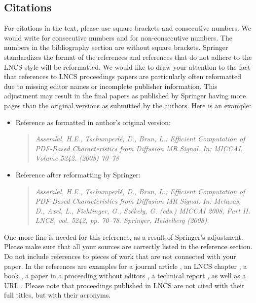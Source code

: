 \documentclass[runningheads]{llncs}
\begin{document}
	\subsection{Citations}
	For citations in the text, please use square brackets and consecutive numbers.
	We would write \cite{Alpher02,Alpher03,Alpher04,Authors10,Authors10b} for consecutive numbers and \cite{Alpher02,Alpher04,Authors10b} for non-consecutive numbers.
	The numbers in the bibliography section are without square brackets.
	Springer standardizes the format of the references and references that do not adhere to the LNCS style will be reformatted.
	We would like to draw your attention to the fact that references to LNCS proceedings papers are particularly often reformatted due to missing editor names or incomplete publisher information.
	This adjustment may result in the final papers as published by Springer having more pages than the original versions as submitted by the authors.
	Here is an example:
	\begin{itemize}
		\item Reference as formatted in author's original version:
		\begin{quote}
			\emph{Assemlal, H.E., Tschumperl\'{e}, D., Brun, L.: Efficient Computation of PDF-Based Characteristics from Diffusion MR Signal. In: MICCAI. Volume 5242. (2008) 70–78}
		\end{quote}
		\item Reference after reformatting by Springer:
		\begin{quote}
			\emph{Assemlal, H.E., Tschumperl\'{e}, D., Brun, L.: Efficient Computation of PDF-Based Characteristics from Diffusion MR Signal. In: Metaxas, D., Axel, L., Fichtinger, G., Sz\'{e}kely, G. (eds.) MICCAI 2008, Part II. LNCS, vol. 5242, pp. 70–78. Springer, Heidelberg (2008)}
		\end{quote}
	\end{itemize}
	One more line is needed for this reference, as a result of Springer’s adjustment.
	Please make sure that all your sources are correctly listed in the reference section.
	Do not include references to pieces of work that are not connected with your paper.
	In the references are examples for a journal article \cite{jour}, an LNCS chapter \cite{lncschap}, a book \cite{book}, a paper in a proceeding without editors \cite{proceeding1}, a technical report \cite{proceeding2}, as well as a URL \cite{url}.
	Please note that proceedings published in LNCS are not cited with their full titles, but with their acronyms.
\end{document}
